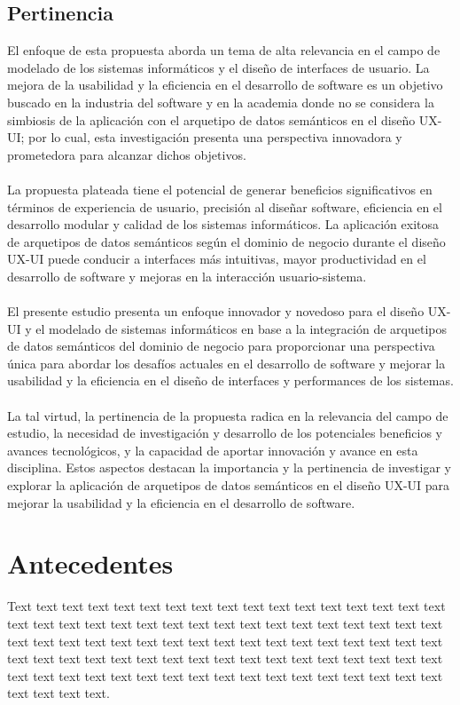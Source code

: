 \documentclass[12pt,a4paper]{article}
\begin{document}
\subsection{Pertinencia}
\label{sec:4}
El enfoque de esta propuesta aborda un tema de alta relevancia en el campo de modelado de los sistemas informáticos y el diseño de interfaces de usuario. La mejora de la usabilidad y la eficiencia en el desarrollo de software es un objetivo buscado en la industria del software y en la academia donde no se considera la simbiosis de la aplicación con el arquetipo de datos semánticos en el diseño UX-UI; por lo cual, esta investigación presenta una perspectiva innovadora y prometedora para alcanzar dichos objetivos.
\\\\
La propuesta plateada tiene el potencial de generar beneficios significativos en términos de experiencia de usuario, precisión al diseñar software, eficiencia en el desarrollo modular y calidad de los sistemas informáticos. La aplicación exitosa de arquetipos de datos semánticos según el dominio de negocio durante el diseño UX-UI puede conducir a interfaces más intuitivas, mayor productividad en el desarrollo de software y mejoras en la interacción usuario-sistema.
\\\\
El presente estudio presenta un enfoque innovador y novedoso para el diseño UX-UI y el modelado de sistemas informáticos en base a la integración de arquetipos de datos semánticos del dominio de negocio para proporcionar una perspectiva única para abordar los desafíos actuales en el desarrollo de software y mejorar la usabilidad y la eficiencia en el diseño de interfaces y performances de los sistemas.
\\\\
La tal virtud, la pertinencia de la propuesta radica en la relevancia del campo de estudio, la necesidad de investigación y desarrollo de los potenciales beneficios y avances tecnológicos, y la capacidad de aportar innovación y avance en esta disciplina. Estos aspectos destacan la importancia y la pertinencia de investigar y explorar la aplicación de arquetipos de datos semánticos en el diseño UX-UI para mejorar la usabilidad y la eficiencia en el desarrollo de software.

\section{Antecedentes}
\label{sec:5}
Text text text text text text text text text text text text text text text text text text text text text text text text text text text text text text text text text text text text text text text text text text text text text text text text text text text text text text text text text text text text text text text text text text text text text text text text text text text text text text text text text text text text text text text text text.
\end{document}
